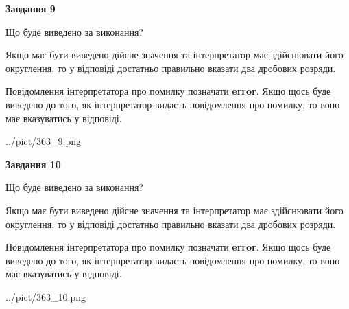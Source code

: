 \documentclass[12pt, ukrainian]{article}
\begin{document}
{\begin {Large}
{\begin {center}\textbf{Завдання 9}\end {center}}\par
Що буде виведено за виконання? \par

Якщо має бути виведено дійсне значення та інтерпретатор має здійснювати його округлення, 
то у відповіді достатньо правильно вказати два дробових розряди.

Повідомлення інтерпретатора про помилку позначати \textbf{error}.
Якщо щось буде виведено до того, як інтерпретатор видасть повідомлення про помилку, 
то воно має вказуватись у відповіді. \par

\begin{center}
	{../pict/363_9.png}
\end{center}
\newpage

{\begin {center}\textbf{Завдання 10}\end {center}}\par
Що буде виведено за виконання? \par

Якщо має бути виведено дійсне значення та інтерпретатор має здійснювати його округлення, 
то у відповіді достатньо правильно вказати два дробових розряди.

Повідомлення інтерпретатора про помилку позначати \textbf{error}.
Якщо щось буде виведено до того, як інтерпретатор видасть повідомлення про помилку, 
то воно має вказуватись у відповіді. \par

\begin{center}
	{../pict/363_10.png}
\end{center}
\newpage

\end {Large}}
\end{document}
